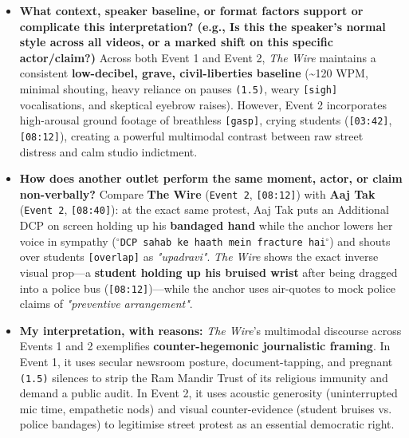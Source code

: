 \documentclass[10pt,a4paper]{article}
\begin{document}
\begin{itemize}
  \item \textbf{What context, speaker baseline, or format factors support or complicate this interpretation? (e.g., Is this the speaker's normal style across all videos, or a marked shift on this specific actor/claim?)}
Across both Event 1 and Event 2, \textit{The Wire} maintains a consistent \textbf{low-decibel, grave, civil-liberties baseline} (\textasciitilde{}120 WPM, minimal shouting, heavy reliance on pauses \texttt{(1.5)}, weary \texttt{[sigh]} vocalisations, and skeptical eyebrow raises). However, Event 2 incorporates high-arousal ground footage of breathless \texttt{[gasp]}, crying students (\texttt{[03:42]}, \texttt{[08:12]}), creating a powerful multimodal contrast between raw street distress and calm studio indictment.\par\smallskip
  \item \textbf{How does another outlet perform the same moment, actor, or claim non-verbally?}
Compare \textbf{The Wire} (\texttt{Event 2}, \texttt{[08:12]}) with \textbf{Aaj Tak} (\texttt{Event 2}, \texttt{[08:40]}): at the exact same protest, Aaj Tak puts an Additional DCP on screen holding up his \textbf{bandaged hand} while the anchor lowers her voice in sympathy (\texttt{$^\circ$DCP sahab ke haath mein fracture hai$^\circ$}) and shouts over students \texttt{[overlap]} as \textit{"upadravi"}. \textit{The Wire} shows the exact inverse visual prop---a \textbf{student holding up his bruised wrist} after being dragged into a police bus (\texttt{[08:12]})---while the anchor uses air-quotes to mock police claims of \textit{"preventive arrangement"}.\par\smallskip
  \item \textbf{My interpretation, with reasons:}
\textit{The Wire}'s multimodal discourse across Events 1 and 2 exemplifies \textbf{counter-hegemonic journalistic framing}. In Event 1, it uses secular newsroom posture, document-tapping, and pregnant \texttt{(1.5)} silences to strip the Ram Mandir Trust of its religious immunity and demand a public audit. In Event 2, it uses acoustic generosity (uninterrupted mic time, empathetic nods) and visual counter-evidence (student bruises vs. police bandages) to legitimise street protest as an essential democratic right.\par\smallskip
\end{itemize}
\end{document}
